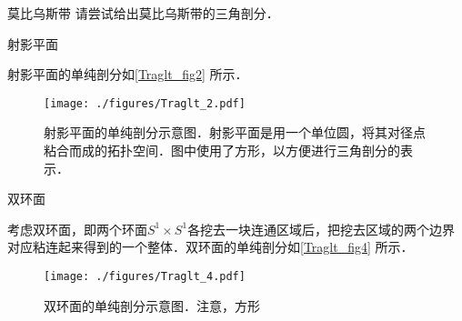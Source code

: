 \begin{exercise}{莫比乌斯带}
请尝试给出莫比乌斯带的三角剖分．
\end{exercise}


\begin{example}{射影平面}

射影平面的单纯剖分如\autoref{Traglt_fig2} 所示．

\begin{figure}[ht]
\centering
\texttt{[image: ./figures/Traglt\_2.pdf]}
\caption{射影平面的单纯剖分示意图．射影平面是用一个单位圆，将其对径点粘合而成的拓扑空间．图中使用了方形，以方便进行三角剖分的表示．} \label{Traglt_fig2}
\end{figure}

\end{example}

\begin{example}{双环面}

考虑双环面，即两个环面$S^1\times S^1$各挖去一块连通区域后，把挖去区域的两个边界对应粘连起来得到的一个整体．双环面的单纯剖分如\autoref{Traglt_fig4} 所示．

\begin{figure}[ht]
\centering
\texttt{[image: ./figures/Traglt\_4.pdf]}
\caption{双环面的单纯剖分示意图．注意，方形} \label{Traglt_fig4}
\end{figure}


\end{example}






